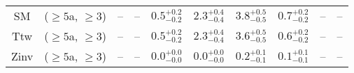 \begin{table}[h!]
{\begin{tabular}{cccccccccc}
	SM & ($\ge5$a, $\ge3$) & -- & -- & $0.5^{+ 0.2 }_{- 0.2 }$ & $2.3^{+ 0.4 }_{- 0.4 }$ & $3.8^{+ 0.5 }_{- 0.5 }$ & $0.7^{+ 0.2 }_{- 0.2 }$ & -- & -- \\[0.5ex] 
	Ttw & ($\ge5$a, $\ge3$) & -- & -- & $0.5^{+ 0.2 }_{- 0.2 }$ & $2.3^{+ 0.4 }_{- 0.4 }$ & $3.6^{+ 0.5 }_{- 0.5 }$ & $0.6^{+ 0.2 }_{- 0.2 }$ & -- & -- \\[0.5ex] 
	Zinv & ($\ge5$a, $\ge3$) & -- & -- & $0.0^{+ 0.0 }_{- 0.0 }$ & $0.0^{+ 0.0 }_{- 0.0 }$ & $0.2^{+ 0.1 }_{- 0.1 }$ & $0.1^{+ 0.1 }_{- 0.1 }$ & -- & -- \\[0.5ex] 
	\hline
	\hline
\end{tabular}}
\end{table}
